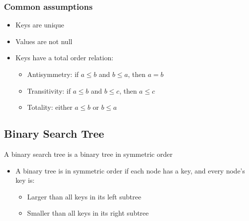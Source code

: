 \documentclass[a4paper]{article}
\begin{document}
\subsubsection*{Common assumptions}
\begin{itemize}
    \item Keys are unique
    \item Values are not null
    \item Keys have a total order relation:
    \begin{itemize}
        \item Antisymmetry: if $a\leq b$ and $b\leq a$, then $a=b$
        \item Transitivity: if $a\leq b$ and $b\leq c$, then $a\leq c$
        \item Totality: either $a\leq b$ or $b\leq a$
    \end{itemize}
\end{itemize}

\subsection{Binary Search Tree}
A binary search tree is a binary tree in symmetric order
\begin{itemize}
    \item A binary tree is in symmetric order if each node has a key, and every node's key is:
    \begin{itemize}
        \item Larger than all keys in its left subtree
        \item Smaller than all keys in its right subtree
    \end{itemize}
\end{itemize}
\end{document}
